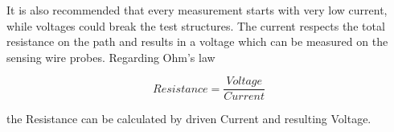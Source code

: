 It is also recommended that every measurement starts with very low current, while voltages could break the test structures.
The current respects the total resistance on the path and results in a voltage which can be measured on the sensing wire probes.
Regarding Ohm's law

\begin{equation}\label{1}
    Resistance = \frac{Voltage}{Current}
\end{equation}

the Resistance can be calculated by driven Current and resulting Voltage.




\clearpage
